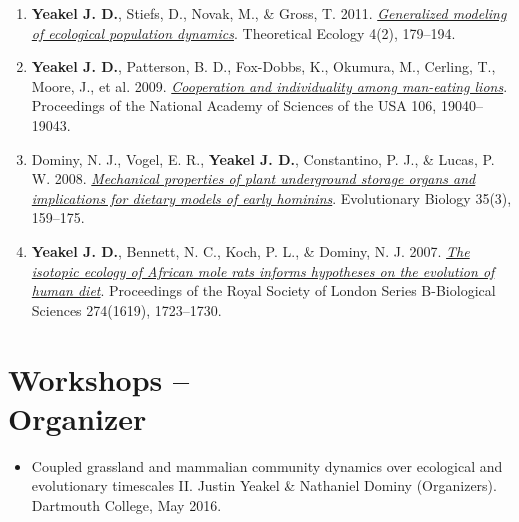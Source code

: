 \documentclass[margin,line,12pt]{res}
\begin{document}
\begin{resume}
\begin{enumerate}
\item \textbf{Yeakel J. D.}, Stiefs, D., Novak, M., \& Gross, T. 2011. \href{https://link.springer.com/article/10.1007/s12080-011-0112-6}{\emph{Generalized modeling of ecological population dynamics}}. Theoretical Ecology 4(2), 179–194.

\item \textbf{Yeakel J. D.}, Patterson, B. D., Fox-Dobbs, K., Okumura, M., Cerling, T., Moore, J., et al. 2009. \href{https://www.pnas.org/content/106/45/19040}{\emph{Cooperation and individuality among man-eating lions}}. Proceedings of the National Academy of Sciences of the USA 106, 19040–19043.

\item Dominy, N. J., Vogel, E. R., \textbf{Yeakel J. D.}, Constantino, P. J., \& Lucas, P. W. 2008. \href{https://link.springer.com/article/10.1007/s11692-008-9026-7}{\emph{Mechanical properties of plant underground storage organs and implications for dietary models of early hominins}}. Evolutionary Biology 35(3), 159–175.

\item \textbf{Yeakel J. D.}, Bennett, N. C., Koch, P. L., \& Dominy, N. J. 2007. \href{https://royalsocietypublishing.org/doi/10.1098/rspb.2007.0330}{\emph{The isotopic ecology of African mole rats informs hypotheses on the evolution of human diet}}. Proceedings of the Royal Society of London Series B-Biological Sciences 274(1619), 1723–1730.

\end{enumerate}

%
%


\section{\sc Workshops -- \\ Organizer}
\begin{itemize}
\item Coupled grassland and mammalian community dynamics over ecological and evolutionary timescales II. Justin Yeakel \& Nathaniel Dominy (Organizers). Dartmouth College, May 2016.


\end{itemize}
\end{resume}
\end{document}
